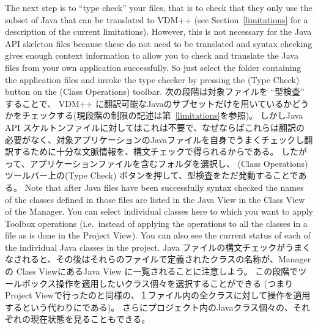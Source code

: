 \documentclass[\pformat,12pt]{jarticle}
\newcommand{\guicmd}[1]{{\sf #1}}
\begin{document}
The next step is to ``type check'' your files, that is to check that
they only use the subset of Java 
that can be translated to VDM++ (see Section~\ref{limitations} for a
description of the current limitations). However, this is not
necessary for the Java API skeleton files because these do not need to
be translated and syntax checking gives enough context information to
allow you to check and translate the Java files from your own
application successfully. So just select the folder containing the
application files and invoke the type checker by pressing the 
(\guicmd{Type Check}) button on the (\guicmd{Class Operations})
toolbar. 
次の段階は対象ファイルを ``型検査'' することで、 VDM++ に翻訳可能なJavaのサブセットだけを用いているかどうかをチェックする(現段階の制限の記述は第~\ref{limitations}を参照)。
しかしJava API スケルトンファイルに対してはこれは不要で、なぜならばこれらは翻訳の必要がなく、対象アプリケーションのJavaファイルを自身でうまくチェックし翻訳するために十分な文脈情報を、構文チェックで得られるからである。
したがって、アプリケーションファイルを含むフォルダを選択し、 (\guicmd{Class Operations})ツールバー上の(\guicmd{Type Check}) ボタンを押して、型検査をただ発動することである。
Note that after Java files have been successfully syntax checked the
names of the classes defined in those files are listed in the
\guicmd{Java View} in the \guicmd{Class View} of the
\guicmd{Manager}. You can select individual classes here to which you
want to apply Toolbox operations (i.e.\ instead of applying the
operations to all the classes in a file as is done in the
\guicmd{Project View}). You can also see the current status of each of
the individual Java classes in the project. 
Java ファイルの構文チェックがうまくなされると、その後はそれらのファイルで定義されたクラスの名称が、\guicmd{Manager}の \guicmd{Class View}にある\guicmd{Java View} に一覧されることに注意しよう。
この段階でツールボックス操作を適用したいクラス個々を選択することができる (つまり\guicmd{Project View}で行ったのと同様の、１ファイル内の全クラスに対して操作を適用するという代わりにである)。 
さらにプロジェクト内のJavaクラス個々の、それぞれの現在状態を見ることもできる。
\end{document}
